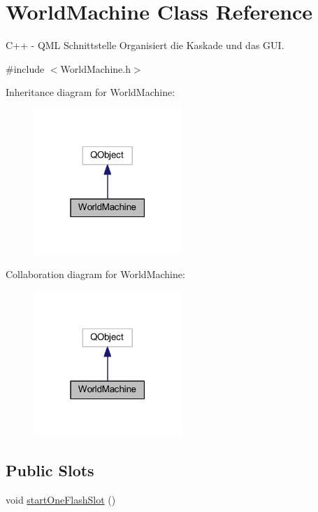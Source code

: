 \hypertarget{class_world_machine}{}\section{World\+Machine Class Reference}
\label{class_world_machine}


C++ -\/ Q\+ML Schnittstelle Organisiert die Kaskade und das G\+UI.  




{\ttfamily \#include $<$World\+Machine.\+h$>$}



Inheritance diagram for World\+Machine\+:\nopagebreak
\begin{figure}[H]
\begin{center}
\leavevmode
\includegraphics[width=159pt]{class_world_machine__inherit__graph}
\end{center}
\end{figure}


Collaboration diagram for World\+Machine\+:\nopagebreak
\begin{figure}[H]
\begin{center}
\leavevmode
\includegraphics[width=159pt]{class_world_machine__coll__graph}
\end{center}
\end{figure}
\subsection*{Public Slots}
\begin{DoxyCompactItemize}
\item 
void \mbox{\hyperlink{class_world_machine_a84f92960f72d17c1a5897072bf203996}{start\+One\+Flash\+Slot}} ()
\end{DoxyCompactItemize}
